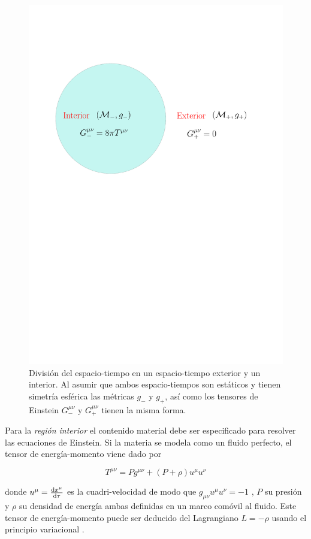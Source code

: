 \begin{figure}%
    \centering
    \includegraphics[width=0.7\linewidth]{figures/GR.pdf}
    \caption[División del espacio-tiempo]{División del espacio-tiempo en un espacio-tiempo exterior y un interior. Al asumir que ambos espacio-tiempos son estáticos y tienen simetría esférica las métricas $g_{-}$ y $g_{+}$, así como los tensores de Einstein $G^{\mu \nu}_{-}$ y $G^{\mu \nu}_{+}$ tienen la misma forma.}
    \label{STDiv}
\end{figure}

Para la \textit{región interior} el contenido material debe ser especificado para resolver las ecuaciones de Einstein. Si la materia se modela como un fluido perfecto, el tensor de energía-momento viene dado por

\begin{equation}\label{EMT}
    T ^ { \mu \nu } =  P g ^ { \mu \nu } + ( P + \rho ) u ^ { \mu } u ^ { \nu }
\end{equation}

donde $u^{\mu}=\dv{x^{\mu}}{\tau}$ es la cuadri-velocidad de modo que $g _ { \mu \nu } u ^ { \mu } u ^ { \nu } = -1$ , $P$ su presión y $\rho$ su densidad de energía ambas definidas en un marco comóvil al fluido. Este tensor de energía-momento puede ser deducido del Lagrangiano $L=-\rho$ usando el principio variacional \cite{Felice19992}.

